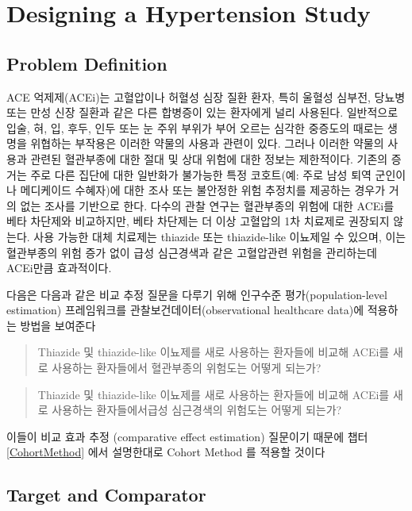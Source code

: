\documentclass[11pt]{book}
\theoremstyle{definition}
\theoremstyle{definition}
\theoremstyle{definition}
\theoremstyle{remark}
\begin{document}
\section{Designing a Hypertension
Study}\label{designing-a-hypertension-study}

\subsection{Problem Definition}\label{problem-definition-1}

ACE 억제제(ACEi)는 고혈압이나 허혈성 심장 질환 환자, 특히 울혈성 심부전,
당뇨병 또는 만성 신장 질환과 같은 다른 합병증이 있는 환자에게 널리
사용된다. \citep{zaman_2002} 일반적으로 입술, 혀, 입, 후두, 인두 또는 눈
주위 부위가 부어 오르는 심각한 중증도의 때로는 생명을 위협하는 부작용은
이러한 약물의 사용과 관련이 있다. \citep{sabroe_1997} 그러나 이러한
약물의 사용과 관련된 혈관부종에 대한 절대 및 상대 위험에 대한 정보는
제한적이다. 기존의 증거는 주로 다른 집단에 대한 일반화가 불가능한 특정
코호트(예: 주로 남성 퇴역 군인이나 메디케이드 수혜자)에 대한 조사 또는
불안정한 위험 추정치를 제공하는 경우가 거의 없는 조사를 기반으로 한다.
\citep{powers_2012} 다수의 관찰 연구는 혈관부종의 위험에 대한 ACEi를
베타 차단제와 비교하지만\citep{magid_2010, toh_2012}, 베타 차단제는 더
이상 고혈압의 1차 치료제로 권장되지 않는다.\citep{whelton_2018} 사용
가능한 대체 치료제는 thiazide 또는 thiazide-like 이뇨제일 수 있으며,
이는 혈관부종의 위험 증가 없이 급성 심근경색과 같은 고혈압관련 위험을
관리하는데 ACEi만큼 효과적이다.

다음은 다음과 같은 비교 추정 질문을 다루기 위해 인구수준
평가(population-level estimation) 프레임워크를
관찰보건데이터(observational healthcare data)에 적용하는 방법을 보여준다

\begin{quote}
Thiazide 및 thiazide-like 이뇨제를 새로 사용하는 환자들에 비교해 ACEi를
새로 사용하는 환자들에서 혈관부종의 위험도는 어떻게 되는가?
\end{quote}

\begin{quote}
Thiazide 및 thiazide-like 이뇨제를 새로 사용하는 환자들에 비교해 ACEi를
새로 사용하는 환자들에서급성 심근경색의 위험도는 어떻게 되는가?
\end{quote}

이들이 비교 효과 추정 (comparative effect estimation) 질문이기 때문에
챕터 \ref{CohortMethod} 에서 설명한대로 Cohort Method 를 적용할 것이다

\subsection{Target and Comparator}\label{target-and-comparator}
\end{document}
